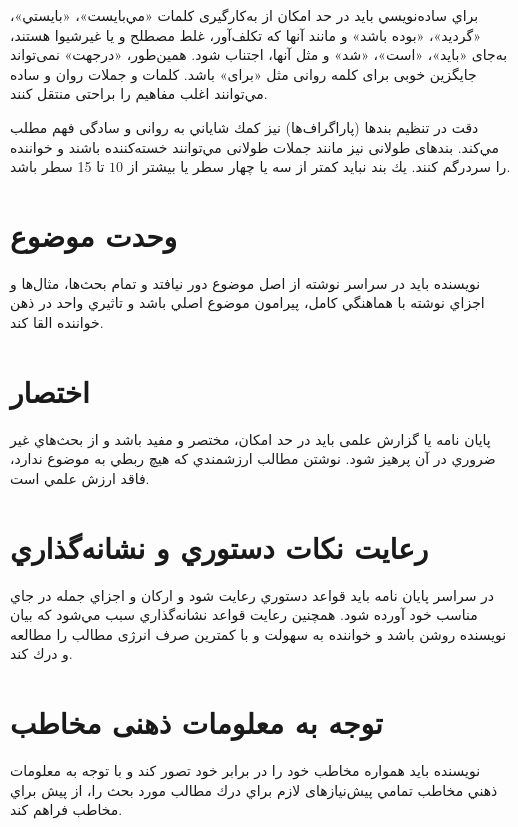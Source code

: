  براي ساده‌نويسي بايد در حد امكان از به‌كارگيری كلمات «مي‌بايست»، «بايستي»، «گرديد»، «بوده باشد» و مانند آنها كه تكلف‌آور، غلط مصطلح و يا غيرشيوا هستند، به‌جای «بايد»، «است»، «شد» و مثل آنها، اجتناب شود‌.‌ همين‌طور، «در‌جهت» نمی‌تواند جايگزين خوبی برای كلمه روانی مثل «برای» باشد‌. ‌كلمات و جملات روان و ساده مي‌توانند اغلب مفاهيم را براحتی منتقل كنند‌.‌
 
دقت در تنظیم بندها (پاراگراف‌ها) نيز كمك شاياني به روانی و سادگی فهم مطلب مي‌كند‌.‌ بندهای طولانی نيز مانند جملات طولانی مي‌توانند خسته‌كننده باشند و خواننده را سردرگم كنند‌.‌ يك بند نبايد کمتر از سه یا چهار سطر یا بيشتر از $10$ تا 15 سطر باشد.‌ 

\section{وحدت موضوع}

نویسنده بايد در سراسر نوشته از اصل موضوع دور نيافتد و تمام بحث‌ها، مثال‌ها و اجزاي نوشته با هماهنگي كامل، پيرامون موضوع اصلي باشد و تاثيري واحد در ذهن خواننده القا كند. 
\section{اختصار}

پایان نامه یا گزارش علمی بايد در حد امكان، مختصر و مفيد باشد و از بحث‌هاي غير ضروري در آن پرهيز شود. نوشتن مطالب ارزشمندي كه هيچ ربطي به موضوع ندارد، فاقد ارزش علمي است.
\section{رعایت نكات دستوري و نشانه‌گذاري}
در سراسر پایان نامه بايد قواعد دستوري رعايت شود و اركان و اجزاي جمله در جاي مناسب خود آورده شود. همچنین رعايت قواعد نشانه‌گذاري سبب مي‌شود كه بيان نويسنده روشن باشد و خواننده به سهولت و با کمترین صرف انرژی مطالب را مطالعه و درك كند.
\section{توجه به معلومات ذهنی مخاطب}
نويسنده بايد همواره مخاطب خود را در برابر خود تصور كند و با توجه به معلومات ذهني مخاطب  تمامي پیش‌نیازهای لازم براي درك مطالب مورد بحث را، از پیش براي مخاطب فراهم كند.

